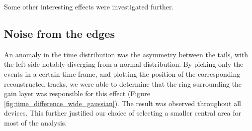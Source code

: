 Some other interesting effects were investigated further.



\subsection{Noise from the edges}\label{sec:deviations_from_gaussian}

An anomaly in the time distribution was the asymmetry between the tails, with the left side notably diverging from a normal distribution. By picking only the events in a certain time frame, and plotting the position of the corresponding reconstructed tracks, we were able to determine that the ring surrounding the gain layer was responsible for this effect (Figure \ref{fig:time_difference_wide_gaussian}). The result was observed throughout all devices. This further justified our choice of selecting a smaller central area for most of the analysis.

